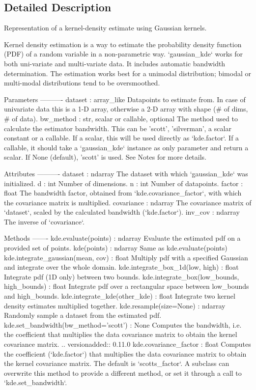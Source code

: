 \subsection{Detailed Description}
\begin{DoxyVerb}Representation of a kernel-density estimate using Gaussian kernels.

Kernel density estimation is a way to estimate the probability density
function (PDF) of a random variable in a non-parametric way.
`gaussian_kde` works for both uni-variate and multi-variate data.   It
includes automatic bandwidth determination.  The estimation works best for
a unimodal distribution; bimodal or multi-modal distributions tend to be
oversmoothed.

Parameters
----------
dataset : array_like
    Datapoints to estimate from. In case of univariate data this is a 1-D
    array, otherwise a 2-D array with shape (# of dims, # of data).
bw_method : str, scalar or callable, optional
    The method used to calculate the estimator bandwidth.  This can be
    'scott', 'silverman', a scalar constant or a callable.  If a scalar,
    this will be used directly as `kde.factor`.  If a callable, it should
    take a `gaussian_kde` instance as only parameter and return a scalar.
    If None (default), 'scott' is used.  See Notes for more details.

Attributes
----------
dataset : ndarray
    The dataset with which `gaussian_kde` was initialized.
d : int
    Number of dimensions.
n : int
    Number of datapoints.
factor : float
    The bandwidth factor, obtained from `kde.covariance_factor`, with which
    the covariance matrix is multiplied.
covariance : ndarray
    The covariance matrix of `dataset`, scaled by the calculated bandwidth
    (`kde.factor`).
inv_cov : ndarray
    The inverse of `covariance`.

Methods
-------
kde.evaluate(points) : ndarray
    Evaluate the estimated pdf on a provided set of points.
kde(points) : ndarray
    Same as kde.evaluate(points)
kde.integrate_gaussian(mean, cov) : float
    Multiply pdf with a specified Gaussian and integrate over the whole
    domain.
kde.integrate_box_1d(low, high) : float
    Integrate pdf (1D only) between two bounds.
kde.integrate_box(low_bounds, high_bounds) : float
    Integrate pdf over a rectangular space between low_bounds and
    high_bounds.
kde.integrate_kde(other_kde) : float
    Integrate two kernel density estimates multiplied together.
kde.resample(size=None) : ndarray
    Randomly sample a dataset from the estimated pdf.
kde.set_bandwidth(bw_method='scott') : None
    Computes the bandwidth, i.e. the coefficient that multiplies the data
    covariance matrix to obtain the kernel covariance matrix.
    .. versionadded:: 0.11.0
kde.covariance_factor : float
    Computes the coefficient (`kde.factor`) that multiplies the data
    covariance matrix to obtain the kernel covariance matrix.
    The default is `scotts_factor`.  A subclass can overwrite this method
    to provide a different method, or set it through a call to
    `kde.set_bandwidth`.



\end{DoxyVerb}
